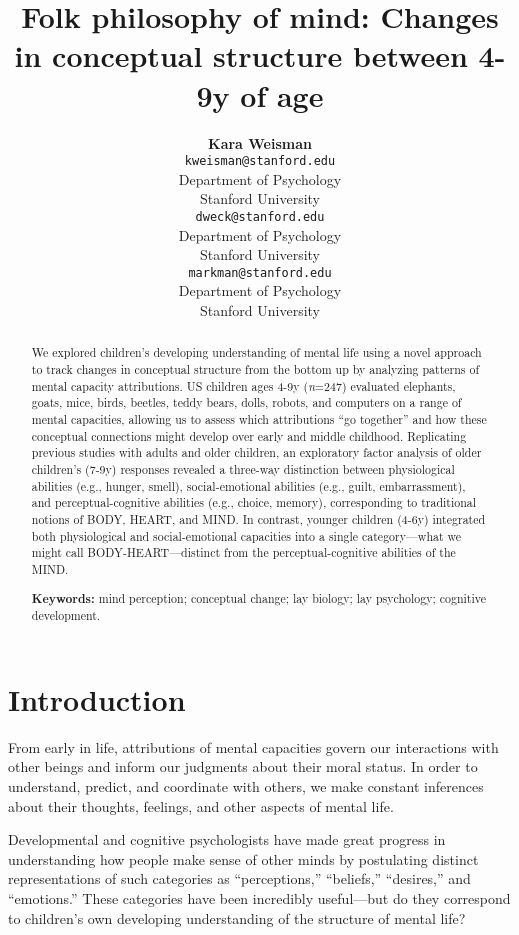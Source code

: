 \documentclass[10pt, letterpaper]{article}
\title{Folk philosophy of mind: Changes in conceptual structure between 4-9y of
age}
\author{{\large \bf Kara Weisman} \\ \texttt{kweisman@stanford.edu} \\ Department of Psychology \\ Stanford University \And {\large \bf Carol S. Dweck} \\ \texttt{dweck@stanford.edu} \\ Department of Psychology \\ Stanford University \And {\large \bf Ellen M. Markman} \\ \texttt{markman@stanford.edu} \\ Department of Psychology \\ Stanford University}
\begin{document}
\maketitle

\begin{abstract}
We explored children's developing understanding of mental life using a
novel approach to track changes in conceptual structure from the bottom
up by analyzing patterns of mental capacity attributions. US children
ages 4-9y (\emph{n}=247) evaluated elephants, goats, mice, birds,
beetles, teddy bears, dolls, robots, and computers on a range of mental
capacities, allowing us to assess which attributions ``go together'' and
how these conceptual connections might develop over early and middle
childhood. Replicating previous studies with adults and older children,
an exploratory factor analysis of older children's (7-9y) responses
revealed a three-way distinction between physiological abilities (e.g.,
hunger, smell), social-emotional abilities (e.g., guilt, embarrassment),
and perceptual-cognitive abilities (e.g., choice, memory), corresponding
to traditional notions of BODY, HEART, and MIND. In contrast, younger
children (4-6y) integrated both physiological and social-emotional
capacities into a single category---what we might call
BODY-HEART---distinct from the perceptual-cognitive abilities of the
MIND.

\textbf{Keywords:}
mind perception; conceptual change; lay biology; lay psychology;
cognitive development.
\end{abstract}

\section{Introduction}\label{introduction}

From early in life, attributions of mental capacities govern our
interactions with other beings and inform our judgments about their
moral status. In order to understand, predict, and coordinate with
others, we make constant inferences about their thoughts, feelings, and
other aspects of mental life.

Developmental and cognitive psychologists have made great progress in
understanding how people make sense of other minds by postulating
distinct representations of such categories as ``perceptions,''
``beliefs,'' ``desires,'' and ``emotions.'' These categories have been
incredibly useful---but do they correspond to children's own developing
understanding of the structure of mental life?
\end{document}
